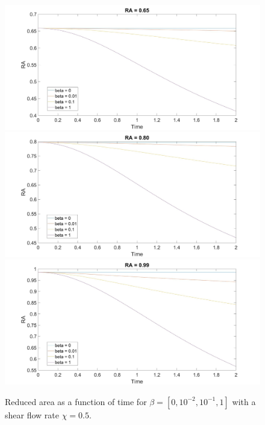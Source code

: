 \documentclass[aps,prl,showpacs]{revtex4}
\begin{document}
\begin{figure}
	\centering
	\includegraphics[width=.9\textwidth]{figures/4.jpg}
	\includegraphics[width=.9\textwidth]{figures/5.jpg}
	\includegraphics[width=.9\textwidth]{figures/6.jpg}
	\caption{Reduced area as a function of time for $\beta = [0, 10^{-2},10^{-1}, 1]$ with a shear flow rate $\chi = 0.5$.}
	\label{Shear0}
\end{figure}
\end{document}
